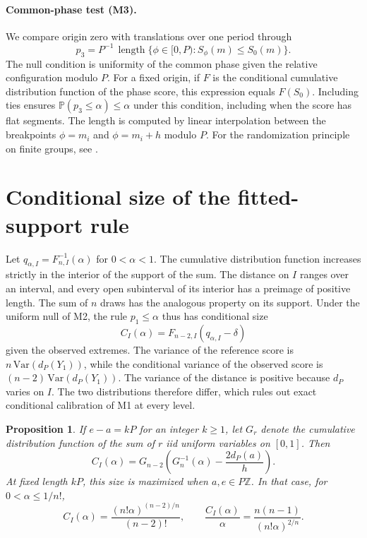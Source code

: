 \documentclass[11pt,a4paper]{article}
\newtheorem{proposition}{Proposition}
\newcommand{\Prb}{\mathbb P}
\begin{document}
\paragraph{Common-phase test (M3).}
We compare origin zero with translations over one period through
\begin{equation}\label{eq:m3}
p_3=P^{-1}\,\operatorname{length}\{\phi\in[0,P):S_\phi(m)\leq S_0(m)\}.
\end{equation}
The null condition is uniformity of the common phase given the relative configuration modulo $P$. For a fixed origin, if $F$ is the conditional cumulative distribution function of the phase score, this expression equals $F(S_0)$. Including ties ensures $\Prb(p_3\leq\alpha)\leq\alpha$ under this condition, including when the score has flat segments. The length is computed by linear interpolation between the breakpoints $\phi=m_i$ and $\phi=m_i+h$ modulo $P$. For the randomization principle on finite groups, see \cite{hemerik}.

\section{Conditional size of the fitted-support rule}

Let $q_{\alpha,I}=F_{n,I}^{-1}(\alpha)$ for $0<\alpha<1$. The cumulative distribution function increases strictly in the interior of the support of the sum. The distance on $I$ ranges over an interval, and every open subinterval of its interior has a preimage of positive length. The sum of $n$ draws has the analogous property on its support. Under the uniform null of M2, the rule $p_1\leq\alpha$ thus has conditional size
\begin{equation}\label{eq:cond}
C_I(\alpha)=F_{n-2,I}(q_{\alpha,I}-\delta)
\end{equation}
given the observed extremes. The variance of the reference score is $n\,\mathrm{Var}(d_P(Y_1))$, while the conditional variance of the observed score is $(n-2)\,\mathrm{Var}(d_P(Y_1))$. The variance of the distance is positive because $d_P$ varies on $I$. The two distributions therefore differ, which rules out exact conditional calibration of M1 at every level.

\begin{proposition}\label{prop:general}
If $e-a=kP$ for an integer $k\geq1$, let $G_r$ denote the cumulative distribution function of the sum of $r$ iid uniform variables on $[0,1]$. Then
\begin{equation}\label{eq:irwin}
C_I(\alpha)=G_{n-2}\!\left(G_n^{-1}(\alpha)-\frac{2d_P(a)}{h}\right).
\end{equation}
At fixed length $kP$, this size is maximized when $a,e\in P\mathbb Z$. In that case, for $0<\alpha\leq1/n!$,
\begin{equation}\label{eq:small}
C_I(\alpha)=\frac{(n!\alpha)^{(n-2)/n}}{(n-2)!},
\qquad
\frac{C_I(\alpha)}{\alpha}=\frac{n(n-1)}{(n!\alpha)^{2/n}}.
\end{equation}
\end{proposition}
\end{document}
